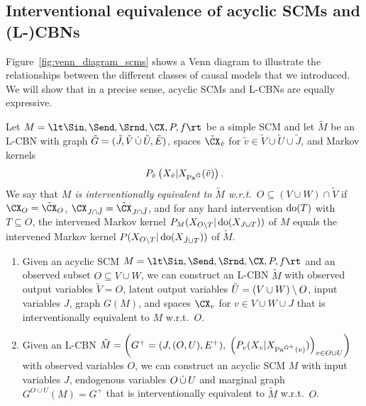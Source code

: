 \subsection{Interventional equivalence of acyclic SCMs and (L-)CBNs}\label{sec:interventional_equivalence_scms_cbns}

Figure~\ref{fig:venn_diagram_scms} shows a Venn diagram to illustrate the relationships between the different
classes of causal models that we introduced.
We will show that in a precise sense, acyclic SCMs and L-CBNs are equally expressive.
\begin{Def}\label{def:interventional_equivalence_cbn_scm}
  Let $M = \lt \Sin, \Send, \Srnd, \CX, P, f \rt$ be a simple SCM and let $\tilde{M}$ be an L-CBN with graph
  $\tilde{G} = (\tilde{J},\tilde{V}\,\dot{\cup}\,\tilde{U},\tilde{E})$, spaces $\tilde{\CX}_{\tilde v}$ for $\tilde{v} \in \tilde{V} \cup \tilde{U} \cup \tilde{J}$,
  and Markov kernels $$P_{\tilde{v}}\left ( X_{\tilde{v}} | X_{\mathrm{Pa}^{\tilde{G}}}(\tilde{v}) \right ).$$
  We say that \emph{$M$ is interventionally equivalent to $\tilde{M}$ w.r.t.\ $O \subseteq (V \cup W) \cap \tilde{V}$} if
  $\CX_O = \tilde{\CX}_O$, $\CX_{J \cap \tilde{J}} = \tilde{\CX}_{J \cap \tilde{J}}$, and
  for any hard intervention $\operatorname{do}(T)$ with $T \subseteq O$, the intervened Markov kernel $P_M(X_{O\setminus T}|\operatorname{do}(X_{J\cup T}))$ of $M$ equals the intervened Markov kernel $P(X_{O\setminus T}|\operatorname{do}(X_{\tilde{J}\cup T}))$ of $\tilde{M}$.
\end{Def}
\begin{Prp}\label{prp:interventional_equivalence_cbn_scm}
  \begin{enumerate}[label=\roman*)]
    \item Given an acyclic SCM $M = \lt \Sin, \Send, \Srnd, \CX, P, f \rt$ and an observed subset $O \subseteq V \cup W$, we can construct an L-CBN $\tilde{M}$ with observed output variables $\tilde{V} = O$, latent output variables $\tilde{U} = (V \cup W) \setminus O$, input variables $J$, graph $G(M)$, and spaces $\CX_v$ for $v \in V\cup W \cup J$ that is interventionally equivalent to $M$ w.r.t.\ $O$.
    \label{prp:interventional_equivalence_cbn_scm:scm2cbn}
    \item Given an L-CBN 
      $\tilde{M} = \left ( G^+=(J,(O,U),E^+), \; \left ( P_v(X_v| X_{\mathrm{Pa}^{G^+}(v)}) \right )_{v\in O \cup U} \right )$
      with observed variables $O$, we can construct an acyclic SCM $M$ with input variables $J$, endogenous variables $O \,\dot{\cup}\, U$ and marginal graph $G^{O\cup U}(M) = G^+$ that is interventionally equivalent to $\tilde{M}$ w.r.t.\ $O$.
    \label{prp:interventional_equivalence_cbn_scm:cbn2scm}
  \end{enumerate}
\end{Prp}
